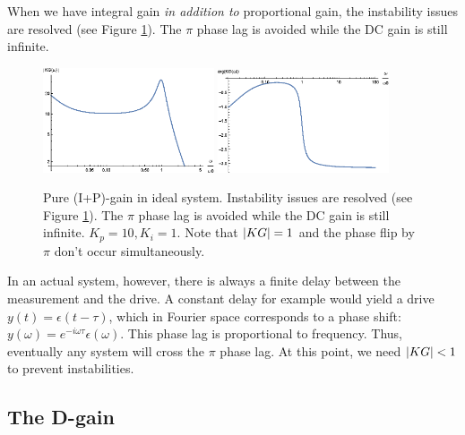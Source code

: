 \documentclass{article}
\theoremstyle{definition}
\begin{document}
When we have integral gain \textit{in addition to} proportional gain, the instability issues are resolved (see Figure \ref{fig:bode_6}). The $\pi$ phase lag is avoided while the DC gain is still infinite. 

\begin{figure}[!htb]
	\centering
	\includegraphics[width=0.45\textwidth]{bode_11}
	\quad
	\includegraphics[width=0.45\textwidth]{bode_12}
	\caption{Pure (I+P)-gain in ideal system. Instability issues are resolved (see Figure \ref{fig:bode_6}). The $\pi$ phase lag is avoided while the DC gain is still infinite. $K_p = 10, K_i = 1$. Note that $\abs{KG}=1$ and the phase flip by $\pi$ don't occur simultaneously.
	} %
	\label{fig:bode_6}
\end{figure}

In an actual system, however, there is always a finite delay between the measurement and the drive. A constant delay for
example would yield a drive $y(t) = \epsilon(t - \tau )$, which in Fourier space corresponds to a phase shift: $y(\omega) = e^{-i\omega \tau}\epsilon(\omega)$. This phase lag is proportional to frequency. Thus, eventually any system will cross the $\pi$ phase lag. At this point, we need $\abs{KG} < 1$ to prevent instabilities.




\subsection{The D-gain}
\end{document}
